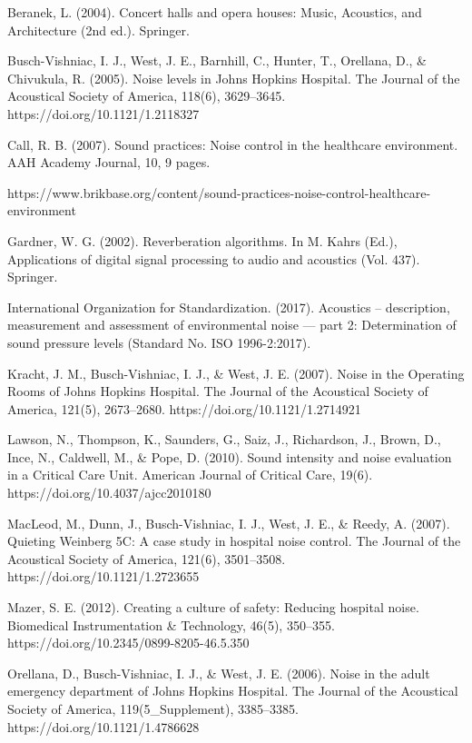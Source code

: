 \documentclass{untref-plan}
\begin{document}
\begin{referencias}

Beranek, L. (2004). Concert halls and opera houses: Music, Acoustics, and Architecture (2nd ed.). Springer.

Busch-Vishniac, I. J., West, J. E., Barnhill, C., Hunter, T., Orellana, D., \& Chivukula, R. (2005). Noise levels in Johns Hopkins Hospital. The Journal of the Acoustical Society of America, 118(6), 3629–3645. https://doi.org/10.1121/1.2118327

Call, R. B. (2007). Sound practices: Noise control in the healthcare environment. AAH Academy Journal, 10, 9 pages.

https://www.brikbase.org/content/sound-practices-noise-control-healthcare-environment

Gardner, W. G. (2002). Reverberation algorithms. In M. Kahrs (Ed.), Applications of digital signal processing to audio and acoustics (Vol. 437). Springer.

International Organization for Standardization. (2017). Acoustics – description, measurement and assessment of environmental noise — part 2: Determination of sound pressure levels (Standard No. ISO 1996-2:2017).

Kracht, J. M., Busch-Vishniac, I. J., \& West, J. E. (2007). Noise in the Operating Rooms of Johns Hopkins Hospital. The Journal of the Acoustical Society of America, 121(5), 2673–2680. https://doi.org/10.1121/1.2714921

Lawson, N., Thompson, K., Saunders, G., Saiz, J., Richardson, J., Brown, D., Ince, N., Caldwell, M., \& Pope, D. (2010). Sound intensity and noise evaluation in a Critical Care Unit. American Journal of Critical Care, 19(6). https://doi.org/10.4037/ajcc2010180

MacLeod, M., Dunn, J., Busch-Vishniac, I. J., West, J. E., \& Reedy, A. (2007). Quieting Weinberg 5C: A case study in hospital noise control. The Journal of the Acoustical Society of America, 121(6), 3501–3508. https://doi.org/10.1121/1.2723655

Mazer, S. E. (2012). Creating a culture of safety: Reducing hospital noise. Biomedical Instrumentation \& Technology, 46(5), 350–355. https://doi.org/10.2345/0899-8205-46.5.350

Orellana, D., Busch-Vishniac, I. J., \& West, J. E. (2006). Noise in the adult emergency department of Johns Hopkins Hospital. The Journal of the Acoustical Society of America, 119(5\_Supplement), 3385–3385. https://doi.org/10.1121/1.4786628


\end{referencias}
\end{document}
